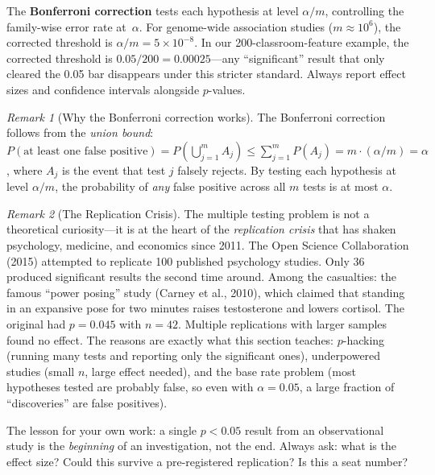 \documentclass[11pt,a4paper]{article}
\theoremstyle{definition}
\theoremstyle{plain}
\theoremstyle{remark}
\newtheorem{remark}{Remark}[section]
\begin{document}
\begin{repairbox}
The \textbf{Bonferroni correction} tests each hypothesis at level $\alpha/m$, controlling the family-wise error rate at~$\alpha$.
For genome-wide association studies ($m \approx 10^6$), the corrected threshold is $\alpha/m = 5 \times 10^{-8}$.
In our 200-classroom-feature example, the corrected threshold is $0.05/200 = 0.00025$---any ``significant'' result that only cleared the 0.05 bar disappears under this stricter standard.
Always report effect sizes and confidence intervals alongside $p$-values.
\end{repairbox}

\begin{remark}[Why the Bonferroni correction works]
The Bonferroni correction follows from the \emph{union bound}: $P(\text{at least one false positive}) = P\!\left(\bigcup_{j=1}^m A_j\right) \leq \sum_{j=1}^m P(A_j) = m \cdot (\alpha/m) = \alpha$, where $A_j$ is the event that test $j$ falsely rejects. By testing each hypothesis at level $\alpha/m$, the probability of \emph{any} false positive across all $m$ tests is at most $\alpha$.
\end{remark}

\begin{remark}[The Replication Crisis]
The multiple testing problem is not a theoretical curiosity---it is at the heart of the \emph{replication crisis} that has shaken psychology, medicine, and economics since 2011. The Open Science Collaboration (2015) attempted to replicate 100 published psychology studies. Only 36 produced significant results the second time around. Among the casualties: the famous ``power posing'' study (Carney et al., 2010), which claimed that standing in an expansive pose for two minutes raises testosterone and lowers cortisol. The original had $p = 0.045$ with $n = 42$. Multiple replications with larger samples found no effect. The reasons are exactly what this section teaches: $p$-hacking (running many tests and reporting only the significant ones), underpowered studies (small $n$, large effect needed), and the base rate problem (most hypotheses tested are probably false, so even with $\alpha = 0.05$, a large fraction of ``discoveries'' are false positives).

The lesson for your own work: a single $p < 0.05$ result from an observational study is the \emph{beginning} of an investigation, not the end. Always ask: what is the effect size? Could this survive a pre-registered replication? Is this a seat number?
\end{remark}
\end{document}
